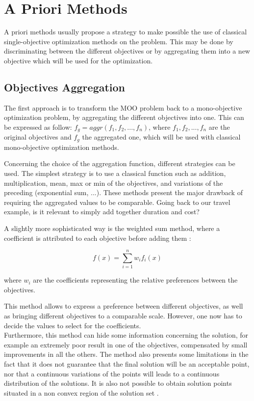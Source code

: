 \section{A Priori Methods}

A priori methods usually propose a strategy to make possible the use of classical single-objective optimization methods on the problem. This may be done by discriminating between the different objectives or by aggregating them into a new objective which will be used for the optimization.

\subsection{Objectives Aggregation}

The first approach is to transform the MOO problem back to a mono-objective optimization problem, by aggregating the different objectives into one. This can be expressed as follow: $f_g = aggr(f_1, f_2, ..., f_n)$, where $f_1, f_2, ..., f_n$ are the original objectives and $f_g$ the aggregated one, which will be used with classical mono-objective optimization methods.

Concerning the choice of the aggregation function, different strategies can be used. The simplest strategy is to use a classical function such as addition, multiplication, mean, max or min of the objectives, and variations of the preceding (exponential sum, ...). These methods present the major drawback of requiring the aggregated values to be comparable. Going back to our travel example, is it relevant to simply add together duration and cost?

A slightly more sophisticated way is the weighted sum method, where a coefficient is attributed to each objective before adding them \cite{Marler2010} :

$$f(x) =\displaystyle\sum_{i=1}^n w_i f_i(x)$$

where $w_i$ are the coefficients representing the relative preferences between the objectives.

This method allows to express a preference between different objectives, as well as bringing different objectives to a comparable scale. However, one now has to decide the values to select for the coefficients.\\
Furthermore, this method can hide some information concerning the solution, for example an extremely poor result in one of the objectives, compensated by small improvements in all the others. The method also presents some limitations in the fact that it does not guarantee that the final solution will be an acceptable point, nor that a continuous variations of the points will leads to a continuous distribution of the solutions. It is also not possible to obtain solution points situated in a non convex region of the solution set \cite{marler2004survey}.


